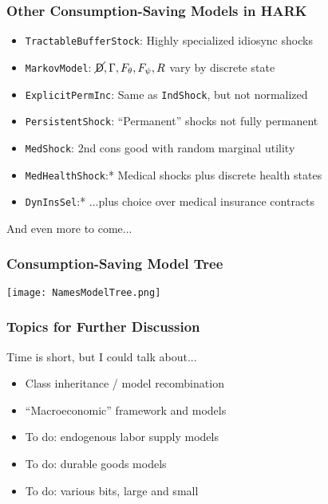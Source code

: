 \documentclass[11ptt]{beamer}
\begin{document}
\begin{frame}
  \frametitle{Other Consumption-Saving Models in HARK}
  \begin{itemize}
  \item <1->\texttt{TractableBufferStock}: Highly specialized idiosync shocks

  \item <2->\texttt{MarkovModel}: $\cancel{\mathsf{D}},\Gamma,F_\theta,F_\psi,R$ vary by discrete state

  \item <3->\texttt{ExplicitPermInc}: Same as \texttt{IndShock}, but not normalized

  \item <3->\texttt{PersistentShock}: ``Permanent'' shocks not fully permanent

  \item <4->\texttt{MedShock}: 2nd cons good with random marginal utility

  \item <5->\texttt{MedHealthShock}:* Medical shocks plus discrete health states

  \item <5->\texttt{DynInsSel}:* ...plus choice over medical insurance contracts
  \end{itemize}
  And even more to come...
\end{frame}


\begin{frame}
  \frametitle{Consumption-Saving Model Tree}
  \begin{center}
    \texttt{[image: NamesModelTree.png]}
  \end{center}
\end{frame}


\begin{frame}\label{DiscussionTopics}
  \frametitle{Topics for Further Discussion}

  Time is short, but I could talk about...
  \begin{itemize}
  \item Class inheritance / model recombination \hyperlink{Recombination}{}

  \item ``Macroeconomic'' framework and models \hyperlink{Macroeconomics}{}

  \item To do: endogenous labor supply models  \hyperlink{LaborSupply}{}

  \item To do: durable goods models \hyperlink{DurableGoods}{}

  \item To do: various bits, large and small \hyperlink{StructuralChanges}{}
  \end{itemize}
\end{frame}
\end{document}
